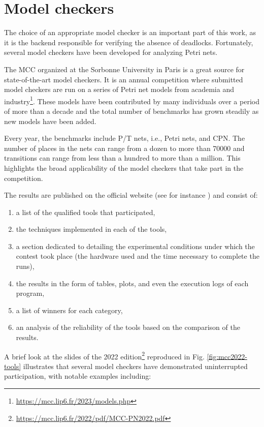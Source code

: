 \section{Model checkers}

The choice of an appropriate model checker is an important part of this work,
as it is the backend responsible for verifying the absence of deadlocks.
Fortunately, several model checkers have been developed for analyzing Petri nets.

The \acrfull{MCC} \cite{khhjp2021} organized at the Sorbonne University in Paris
is a great source for state-of-the-art model checkers.
It is an annual competition where submitted model checkers are run on a series of
Petri net models from academia and industry\footnote{\url{https://mcc.lip6.fr/2023/models.php}}.
These models have been contributed by many individuals over a period of more than a decade
and the total number of benchmarks has grown steadily as new models have been added.

Every year, the benchmarks include \acrfull{P/T nets}, i.e., Petri nets, and \acrfull{CPN}.
The number of places in the nets can range from a dozen to more than 70000 and transitions
can range from less than a hundred to more than a million.
This highlights the broad applicability of the model checkers that take part in the competition.

The results are published on the official website (see for instance \cite{mcc:2022}) and consist of:

\begin{enumerate}
      \item a list of the qualified tools that participated,
      \item the techniques implemented in each of the tools,
      \item a section dedicated to detailing the experimental conditions under which the contest took place
            (the hardware used and the time necessary to complete the runs),
      \item the results in the form of tables, plots, and even the execution logs of each program,
      \item a list of winners for each category,
      \item an analysis of the reliability of the tools based on the comparison of the results.
\end{enumerate}

A brief look at the slides of the 2022 edition\footnote{\url{https://mcc.lip6.fr/2022/pdf/MCC-PN2022.pdf}}
reproduced in Fig. \ref{fig:mcc2022-tools} illustrates
that several model checkers have demonstrated uninterrupted participation,
with notable examples including:

